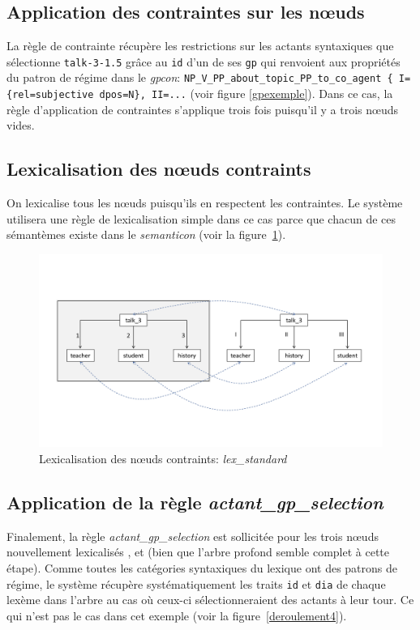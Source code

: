\subsection{Application des contraintes sur les n\oe{}uds}
La règle de contrainte récupère les restrictions sur les actants syntaxiques que sélectionne \texttt{talk-3-1.5} grâce au \texttt{id} d'un de ses \texttt{gp} qui renvoient aux propriétés du patron de régime dans le \emph{gpcon}: \lstinline|NP_V_PP_about_topic_PP_to_co_agent { I={rel=subjective dpos=N}, II=...| (voir figure \ref{gpexemple}). Dans ce cas, la règle d'application de contraintes s'applique trois fois puisqu'il y a trois n\oe{}uds vides.

\subsection{Lexicalisation des n\oe{}uds contraints}
On lexicalise tous les n\oe{}uds puisqu'ils en respectent les contraintes. Le système utilisera une règle de lexicalisation simple dans ce cas parce que chacun de ces sémantèmes existe dans le \emph{semanticon} (voir la figure~\ref{deroulement3}).

\begin{figure}[htb]
	\centering
	\includegraphics[width=1\textwidth, trim = {0cm 3.6cm 0cm 4.6cm},clip]{ch6/figs/actant_gp_lexical.pdf}
	\caption{Lexicalisation des n\oe{}uds contraints: \emph{lex\_standard}}
	\label{deroulement3}
\end{figure}

\subsection{Application de la règle \emph{actant\_gp\_selection}}
Finalement, la règle \emph{actant\_gp\_selection} est sollicitée pour les trois n\oe{}uds nouvellement lexicalisés ,  et  (bien que l'arbre profond semble complet à cette étape). Comme toutes les catégories syntaxiques du lexique ont des patrons de régime, le système récupère systématiquement les traits \texttt{id} et \texttt{dia} de chaque lexème dans l'arbre au cas où ceux-ci sélectionneraient des actants à leur tour. Ce qui n'est pas le cas dans cet exemple (voir la figure~\ref{deroulement4}).

